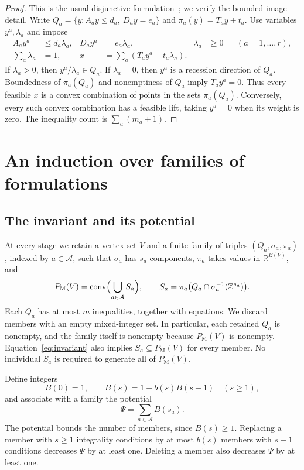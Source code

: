 \documentclass[11pt]{article}
\theoremstyle{definition}
\DeclareMathOperator{\conv}{conv}
\newcommand{\R}{\mathbb R}
\newcommand{\Z}{\mathbb Z}
\newcommand{\PM}{P_{\mathrm M}}
\begin{document}
\begin{proof}
This is the usual disjunctive formulation~\cite{Balas1998}; we verify the
bounded-image detail. Write
$Q_a=\{y:A_a y\leq d_a,\ D_a y=e_a\}$ and
$\pi_a(y)=T_a y+t_a$. Use variables $y^a,\lambda_a$ and impose
\begin{align*}
 A_a y^a&\leq d_a\lambda_a,& D_a y^a&=e_a\lambda_a,&\lambda_a&\geq0
 &&(a=1,\ldots,r),\\
 \sum_a\lambda_a&=1,& x&=\sum_a(T_a y^a+t_a\lambda_a).
\end{align*}
If $\lambda_a>0$, then $y^a/\lambda_a\in Q_a$. If $\lambda_a=0$,
then $y^a$ is a recession direction of $Q_a$. Boundedness of $\pi_a(Q_a)$
and nonemptiness of $Q_a$ imply $T_a y^a=0$. Thus every feasible $x$ is
a convex combination of points in the sets $\pi_a(Q_a)$. Conversely, every
such convex combination has a feasible lift, taking $y^a=0$ when its weight
is zero. The inequality count is $\sum_a(m_a+1)$.
\end{proof}

\section{An induction over families of formulations}\label{sec:families}

\subsection{The invariant and its potential}
At every stage we retain a vertex set $V$ and a finite family of triples
$(Q_a,\sigma_a,\pi_a)$, indexed by $a\in\mathcal A$, such that
$\sigma_a$ has $s_a$ components, $\pi_a$ takes values in $\R^{E(V)}$,
and
\begin{equation}\label{eq:invariant}
 \PM(V)=\conv\Bigl(\bigcup_{a\in\mathcal A} S_a\Bigr),\qquad
 S_a=\pi_a\bigl(Q_a\cap\sigma_a^{-1}(\Z^{s_a})\bigr).
\end{equation}
Each $Q_a$ has at most $m$ inequalities, together with equations. We discard
members with an empty mixed-integer set. In particular, each retained $Q_a$
is nonempty, and the family itself is nonempty because $\PM(V)$ is nonempty.
Equation~\eqref{eq:invariant} also implies $S_a\subseteq\PM(V)$ for every
member. No individual $S_a$ is required to generate all of $\PM(V)$.

Define integers
\begin{equation}\label{eq:B}
 B(0)=1,\qquad B(s)=1+b(s)B(s-1)\quad(s\geq1),
\end{equation}
and associate with a family the potential
\begin{equation}\label{eq:potential}
 \Psi=\sum_{a\in\mathcal A}B(s_a).
\end{equation}
The potential bounds the number of members, since $B(s)\geq1$. Replacing
a member with $s\geq1$ integrality conditions by at most $b(s)$ members
with $s-1$ conditions decreases $\Psi$ by at least one. Deleting a member
also decreases $\Psi$ by at least one.
\end{document}
